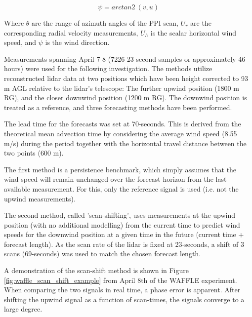 \begin{equation}
    \psi = arctan2\: (v,u)
    \label{eq:wdir}
\end{equation}

Where $\theta$ are the range of azimuth angles of the PPI scan, $U_r$ are the corresponding radial velocity measurements, $U_h$ is the scalar horizontal wind speed, and $\psi$ is the wind direction.

Measurements spanning April 7-8 (7226 23-second samples or approximately 46 hours) were used for the following investigation. The methods utilize reconstructed lidar data at two positions which have been height corrected to 93 m AGL relative to the lidar's telescope: The further upwind position (1800 m RG), and the closer downwind position (1200 m RG). The downwind position is treated as a reference, and three forecasting methods have been performed.

The lead time for the forecasts was set at 70-seconds. This is derived from the theoretical mean advection time by considering the average wind speed (8.55 m/s) during the period together with the horizontal travel distance between the two points (600 m). 

The first method is a persistence benchmark, which simply assumes that the wind speed will remain unchanged over the forecast horizon from the last available measurement. For this, only the reference signal is used (i.e. not the upwind measurements).

The second method, called 'scan-shifting', uses measurements at the upwind position (with no additional modelling) from the current time to predict wind speeds for the downwind position at a given time in the future (current time + forecast length). As the scan rate of the lidar is fixed at 23-seconds, a shift of 3 scans (69-seconds) was used to match the chosen forecast length.

A demonstration of the scan-shift method is shown in Figure \ref{fig:waffle_scan_shift_example} from April 8th of the WAFFLE experiment. When comparing the two signals in real time, a phase error is apparent. After shifting the upwind signal as a function of scan-times, the signals converge to a large degree.

